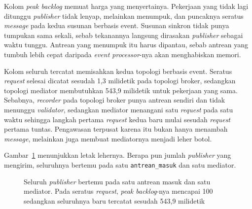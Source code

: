 Kolom \textit{peak backlog} memuat
harga yang menyertainya. Pekerjaan yang tidak
lagi ditunggu \textit{publisher} tidak lenyap, melainkan menumpuk, dan puncaknya seratus
\textit{message} pada kedua susunan berbasis event. Susunan sinkron tidak punya tumpukan
sama sekali, sebab tekanannya langsung dirasakan \textit{publisher} sebagai waktu tunggu.
Antrean yang menumpuk itu harus dipantau, sebab antrean yang tumbuh lebih cepat
daripada \textit{event processor}-nya akan menghabiskan memori.

Kolom seluruh tercatat memisahkan kedua topologi berbasis event.
Seratus \textit{request} selesai dicatat sesudah 1,3 milidetik pada topologi broker,
sedangkan topologi mediator membutuhkan 543,9 milidetik untuk pekerjaan yang
sama. Sebabnya, \textit{recorder} pada topologi broker punya antrean sendiri dan tidak
menunggu \textit{validator}, sedangkan mediator menangani satu \textit{request} pada satu
waktu sehingga langkah pertama \textit{request} kedua baru mulai sesudah \textit{request}
pertama tuntas. Pengawasan terpusat karena itu bukan hanya menambah \textit{message},
melainkan juga membuat mediatornya menjadi leher botol.

Gambar~\ref{fig:leher-botol} menunjukkan letak lehernya. Berapa pun jumlah
\textit{publisher} yang mengirim, seluruhnya bertemu pada satu \texttt{antrean\_masuk}
dan satu mediator.

\begin{figure}[htbp]
  \centering
  \caption{Seluruh \textit{publisher} bertemu pada satu antrean masuk dan satu
    mediator. Pada seratus \textit{request}, \textit{peak backlog}-nya mencapai 100
    sedangkan seluruhnya baru tercatat sesudah 543,9 milidetik}
  \label{fig:leher-botol}
\end{figure}

